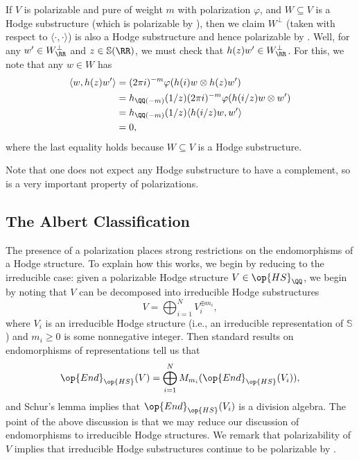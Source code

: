 \documentclass[../thesis.tex]{subfiles}
\begin{document}
\begin{example} \label{ex:complement-hodge-structure}
	If $V$ is polarizable and pure of weight $m$ with polarization $\varphi$, and $W\subseteq V$ is a Hodge substructure (which is polarizable by ), then we claim $W^\perp$ (taken with respect to $\langle\cdot,\cdot\rangle$) is also a Hodge substructure and hence polarizable by . Well, for any $w'\in W_\RR^\perp$ and $z\in\mathbb S(\RR)$, we must check that $h(z)w'\in W_\RR^\perp$. For this, we note that any $w\in W$ has
	\begin{align*}
		\langle w,h(z)w'\rangle &= (2\pi i)^{-m}\varphi(h(i)w\otimes h(z)w') \\
		&= h_{\QQ(-m)}(1/z)(2\pi i)^{-m}\varphi(h(i/z)w\otimes w') \\
		&= h_{\QQ(-m)}(1/z)\langle h(i/z)w, w'\rangle \\
		&= 0,
	\end{align*}
	where the last equality holds because $W\subseteq V$ is a Hodge substructure.
\end{example}
Note that one does not expect any Hodge substructure to have a complement, so  is a very important property of polarizations.

\subsection{The Albert Classification}
The presence of a polarization places strong restrictions on the endomorphisms of a Hodge structure. To explain how this works, we begin by reducing to the irreducible case: given a polarizable Hodge structure $V\in\op{HS}_\QQ$, we begin by noting that $V$ can be decomposed into irreducible Hodge substructures
\[V=\bigoplus_{i=1}^NV_i^{\oplus m_i},\]
where $V_i$ is an irreducible Hodge structure (i.e., an irreducible representation of $\mathbb S$) and $m_i\ge0$ is some nonnegative integer. Then standard results on endomorphisms of representations tell us that
\[\op{End}_{\op{HS}}(V)=\bigoplus_{i=1}^NM_{m_i}(\op{End}_{\op{HS}}(V_i)),\]
and Schur's lemma implies that $\op{End}_{\op{HS}}(V_i)$ is a division algebra. The point of the above discussion is that we may reduce our discussion of endomorphisms to irreducible Hodge structures. We remark that polarizability of $V$ implies that irreducible Hodge substructures continue to be polarizable by .
\end{document}
